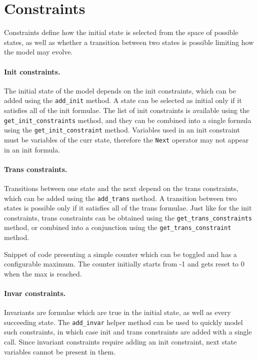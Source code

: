 \section{Constraints}
Constraints define how the initial state is selected from the space of possible states, as well as whether a transition between two states is possible limiting how the model may evolve.

\paragraph*{Init constraints.}
The initial state of the model depends on the init constraints, which can be added using the \texttt{add\_init} method.
A state can be selected as initial only if it satisfies all of the init formulae.
The list of init constraints is available using the \texttt{get\_init\_constraints} method, and they can be combined into a single formula using the \texttt{get\_init\_constraint} method.
Variables used in an init constraint must be variables of the curr state, therefore the \texttt{Next} operator may not appear in an init formula.

\paragraph*{Trans constraints.}
Transitions between one state and the next depend on the trans constraints, which can be added using the \texttt{add\_trans} method.
A transition between two states is possible only if it satisfies all of the trans formulae.
Just like for the init constraints, trans constraints can be obtained using the \texttt{get\_trans\_constraints} method, or combined into a conjunction using the \texttt{get\_trans\_constraint} method.

\begin{listing}
    \label{alg:modelling}
    \caption{Snippet of code presenting a simple counter which can be toggled and has a configurable maximum. The counter initially starts from -1 and gets reset to 0 when the max is reached.}
\end{listing}

\paragraph*{Invar constraints.}
Invariants are formulae which are true in the initial state, as well as every succeeding state.
The \texttt{add\_invar} helper method can be used to quickly model such constraints, in which case init and trans constraints are added with a single call.
Since invariant constraints require adding an init constraint, next state variables cannot be present in them.

